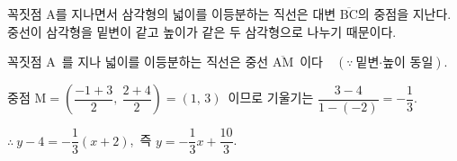\documentclass[10pt]{article}
\begin{document}
\begin{dmapproach}
꼭짓점 $\mathrm{A}$를 지나면서 삼각형의 넓이를 이등분하는 직선은 대변 $\overline{\mathrm{BC}}$의 중점을 지난다. 중선이 삼각형을 밑변이 같고 높이가 같은 두 삼각형으로 나누기 때문이다.
\end{dmapproach}

\begin{dmsolution}
꼭짓점 $\mathrm{A}$\ 를 지나 넓이를 이등분하는 직선은 중선 $\overline{\mathrm{AM}}$\ 이다$\quad(\because\ \text{밑변·높이 동일})$.

중점 $\mathrm{M} = \left( \dfrac{-1+3}{2},\ \dfrac{2+4}{2} \right) = (1,\, 3)$\ 이므로 기울기는 $\dfrac{3-4}{1-(-2)} = -\dfrac{1}{3}$.

$\therefore\ y - 4 = -\dfrac{1}{3}(x+2)$,\ 즉 $y = -\dfrac{1}{3}x + \dfrac{10}{3}$.
\end{dmsolution}

\dmchecktitle



\newpage

\dmconcepthead
{}
\end{document}
